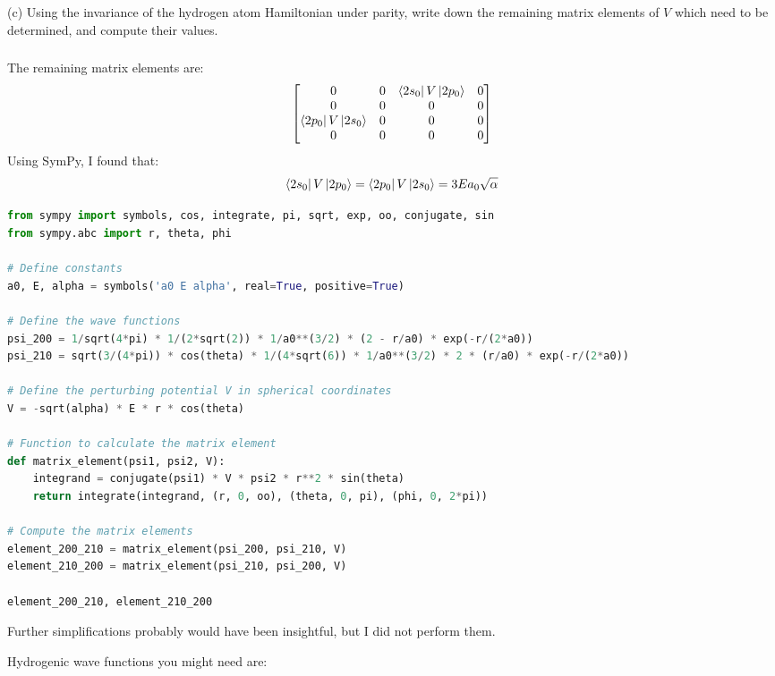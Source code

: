 \documentclass[12pt]{article}
\begin{document}
(c) Using the invariance of the hydrogen atom Hamiltonian under parity, write down the remaining matrix elements of $V$ which need to be determined, and compute their values.
\subsubsection{}
The remaining matrix elements are:
\begin{equation}
  \begin{bmatrix}
    0 & 0 & \bra{2s_{0}}V\ket{2p_{0}} & 0 \\
    0 & 0 & 0 & 0 \\
    \bra{2p_{0}}V\ket{2s_{0}} & 0 & 0 & 0 \\
    0 & 0 & 0 & 0
  \end{bmatrix}
\end{equation}
Using SymPy, I found that:
\begin{equation}
  \bra{2s_{0}}V\ket{2p_{0}} = \bra{2p_{0}}V\ket{2s_{0}} = 3Ea_0 \sqrt{\alpha }
\end{equation}
\begin{lstlisting}[language=Python]
from sympy import symbols, cos, integrate, pi, sqrt, exp, oo, conjugate, sin
from sympy.abc import r, theta, phi

# Define constants
a0, E, alpha = symbols('a0 E alpha', real=True, positive=True)

# Define the wave functions
psi_200 = 1/sqrt(4*pi) * 1/(2*sqrt(2)) * 1/a0**(3/2) * (2 - r/a0) * exp(-r/(2*a0))
psi_210 = sqrt(3/(4*pi)) * cos(theta) * 1/(4*sqrt(6)) * 1/a0**(3/2) * 2 * (r/a0) * exp(-r/(2*a0))

# Define the perturbing potential V in spherical coordinates
V = -sqrt(alpha) * E * r * cos(theta)

# Function to calculate the matrix element
def matrix_element(psi1, psi2, V):
    integrand = conjugate(psi1) * V * psi2 * r**2 * sin(theta)
    return integrate(integrand, (r, 0, oo), (theta, 0, pi), (phi, 0, 2*pi))

# Compute the matrix elements
element_200_210 = matrix_element(psi_200, psi_210, V)
element_210_200 = matrix_element(psi_210, psi_200, V)

element_200_210, element_210_200


\end{lstlisting}
Further simplifications probably would have been insightful, but I did not perform them.


Hydrogenic wave functions you might need are:
\end{document}
